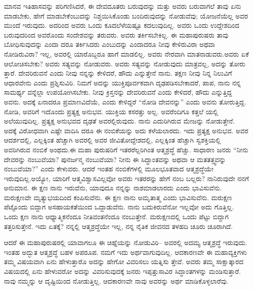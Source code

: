 ಮಾನವ ಇತಿಹಾಸವನ್ನು ಪರಿಗಣಿಸಿದರೆ, ಈ ದೇವದೂತರು ಬರುವುದನ್ನು ಮತ್ತು ಅವರು ಬರುವಾಗಲೆ ತಾವು ಏನು ಮಾಡಬೇಕು, ಹೇಗೆ ಮಾಡಬೇಕೆಂಬುದನ್ನು ನಿಶ್ಚಯಿಸಿಕೊಂಡು ಬಂದಿರುವುದನ್ನು ನೋಡುವೆವು; ಯೋಜನೆಯೆಲ್ಲ ಅವರ ಮುಂದೆ ಇರುವುದು. ಅದರಿಂದ ಅವರು ಒಂದು ಕೂದಲೆಳೆಯಷ್ಟೂ ಕದಲುವುದಿಲ್ಲ. ಅವರು ಒಂದು ಉದ್ದೇಶದಿಂದ ಬರುವುದರಿಂದ ಅವರೊಂದು ಸಂದೇಶವನ್ನು ತರುವರು. ಅವರು ತರ್ಕಿಸಬೇಕಿಲ್ಲ. ಈ ಮಹಾಪುರುಷರು ತಾವು ಬೋಧಿಸುವುದನ್ನು ಎಂದಾ ದರೂ ತರ್ಕಿಸಿದರು ಎಂಬುದನ್ನು ಎಂದಾದರೂ ನೀವು ಕೇಳಿರುವಿರಾ ಅಥವಾ ನೋಡಿರುವಿರಾ? ಇಲ್ಲ, ಅವರಲ್ಲಿ ಯಾರೊಬ್ಬರೂ ಹಾಗೆ ಮಾಡಲಿಲ್ಲ. ಅವರು ನೇರವಾಗಿ ಮಾತನಾಡುವರು.ಅವರು ಏಕೆ ಆಲೋಚಿಸಬೇಕು? ಅವರು ಸತ್ಯವನ್ನು ನೋಡುವರು. ಅವರು ಸತ್ಯವನ್ನು ನೋಡುವುದು ಮಾತ್ರವಲ್ಲ, ಅದನ್ನು ತೋರು ತ್ತಾರೆ. ದೇವರಿರುವನೆ ಎಂದು ನೀವು ನನ್ನನ್ನು ಕೇಳಿದರೆ, ಹೌದು ಎನ್ನುತ್ತೇನೆ ನಾನು. ತಕ್ಷಣ ನೀವು ನಿನ್ನ ನಿಲುವಿಗೆ ಆಧಾರವೇನು ಎಂದು ಪ್ರಶ್ನಿಸುವಿರಿ. ನಿಮಗೆ ಅದನ್ನು ಯುಕ್ತಿಪೂರ್ವಕವಾಗಿ ದೃಢಪಡಿಸಬೇಕಾದರೆ, ಪಾಪ, ನಾನು ನನ್ನ ಸಾಮರ್ಥ್ಯ ವನ್ನೆಲ್ಲಾ ಉಪಯೋಗಿಸಬೇಕು. ನೀವು ಕ್ರಿಸ್ತನನ್ನು ದೇವರಿರುವನೆ ಎಂದು ಕೇಳಿದರೆ, ಹೌದು ಎನ್ನುತ್ತಿದ್ದ ಅವನು. ಅದಕ್ಕೆ ಏನಾದರೂ ಪ್ರಮಾಣವಿದೆಯೆ, ಎಂದು ಕೇಳಿದ್ದರೆ “ನೋಡಿ ದೇವನನ್ನು” ಎಂದು ಅವನು ತೋರುತ್ತಿದ್ದ. ನೋಡಿ, ಅವರಿಗೆ ಇದೊಂದು ಪ್ರತ್ಯಕ್ಷ ಅನುಭವ. ಯುಕ್ತಿಯ ಕಸರತ್ತು ಅಲ್ಲ. ಅವರೆಂದಿಗೂ ಕತ್ತಲೆ ಯಲ್ಲಿ ಅಲೆಯುವುದಿಲ್ಲ. ಪ್ರತ್ಯಕ್ಷ ಅನುಭವದ ದೃಢತೆ ಅವರಲ್ಲಿರುವುದು. ನಾನು ಎದುರಿಗಿರುವ ಮೇಜನ್ನು ನೋಡುತ್ತೇನೆ. ಅದಕ್ಕೆ ವಿರೋಧವಾಗಿ ಎಷ್ಟೇ ವಾದಿಸಿ ದರೂ ಈ ನಂಬಿಕೆಯನ್ನು ಅದು ಕಳೆಯಲಾರದು. ಇದು ಪ್ರತ್ಯಕ್ಷ ಅನುಭವ. ಅವರ ಆದರ್ಶದಲ್ಲಿ, ಎಲ್ಲಕ್ಕಿಂತ ಹೆಚ್ಚಾಗಿ ಅವರಲ್ಲಿ ಅವರ ಜೀವಿತೋದ್ದೇಶದಲ್ಲಿ, ಎಲ್ಲಕ್ಕಿಂತ ಹೆಚ್ಚಾಗಿ ಸ್ವಶಕ್ತಿಯಲ್ಲಿ ಅವರಿಗಿರುವ ನಂಬಿಕೆ ಅಂಥದು.ಈ ಮಹಾ ಪುರುಷರಿಗೆ ಇತರರೆಲ್ಲರಿಗಿಂತ ಆತ್ಮಶ್ರದ್ಧೆ ಹೆಚ್ಚು. ಸಾಧಾರಣ ಜನರು “ನೀನು ದೇವರನ್ನು ನಂಬುವೆಯಾ? ಪುನರ್ಜನ್ಮ ನಂಬುವೆಯಾ? ನೀನು ಈ ಸಿದ್ಧಾಂತವನ್ನು ಅಥವಾ ಆ ಮತತತ್ತ್ವವನ್ನು ನಂಬುವೆಯಾ?” ಎಂದು ಕೇಳುವರು. ಆದರೆ ಇಂತಹ ನಂಬಿಕೆಗಳಲ್ಲಿ ಮೂಲಭೂತವಾದ ಆತ್ಮಶ್ರದ್ಧೆಯೇ ಇರುವುದಿಲ್ಲ.ಅಯ್ಯೋ, ಯಾರಿಗೆ ಆತ್ಮವಿಶ್ವಾಸವಿಲ್ಲವೋ ಅವರು ಇತರರನ್ನು ಹೇಗೆ ನಂಬ ಬಲ್ಲರು? ನಾನಿರುವುದೇ ನನಗೆ ಅನುಮಾನ. ಈ ಕ್ಷಣ ನಾನು ಇರುವೆನು, ಯಾವುದೂ ನನ್ನನ್ನು ನಾಶಮಾಡಲಾರದು ಎಂದು ಭಾವಿಸುವೆನು. ಮರುಕ್ಷಣವೇ ಮೃತ್ಯುಭಯದಿಂದ ಕಂಪಿಸುವೆನು. ಈ ಕ್ಷಣ ನಾನು ಅಮೃತಾತ್ಮ ಎಂದು ಭಾವಿಸುವೆನು. ಮರುಕ್ಷಣ ಪೆಟ್ಟೊಂದು ಬಿದ್ದಾಗ ಅಸಹಾಯಕತೆಯಿಂದ ಒದ್ದಾಡುವೆನು. ನಾನು ಬದುಕಿರುವೆನೋ ಇಲ್ಲವೋ ಅದು ಗೊತ್ತಿಲ್ಲ. ಒಂದು ಕ್ಷಣ ನಾನು ಆಧ್ಯಾತ್ಮಿಕನೆಂದೂ ನೀತಿವಂತನೆಂದೂ ನಂಬುತ್ತೇನೆ. ಮರುಕ್ಷಣದಲ್ಲಿ ಒಂದು ಪೆಟ್ಟು ಬಿದ್ದಾಗ ತತ್ತರಿಸುತ್ತೇನೆ. ಇದು ಏತಕ್ಕೆ? ನನ್ನಲ್ಲಿ ಆತ್ಮಶ್ರದ್ಧೆಯೇ ಇಲ್ಲ, ನನ್ನ ನೈತಿಕ ಜೀವನದ ತಳಹದಿ ಚೂರು ಚೂರಾಗಿದೆ.

ಆದರೆ ಈ ಮಹಾಪುರುಷರಲ್ಲಿ ಯಾವಾಗಲೂ ಈ ಚಿಹ್ನೆಯನ್ನು ನೋಡುವಿರಿ– ಅವರಲ್ಲಿ ಅದಮ್ಯ ಆತ್ಮಶ್ರದ್ಧೆ ಇರುವುದು. ಇಂತಹ ಅದ್ಭುತ ಆತ್ಮಶ್ರದ್ಧೆ ಬಹಳ ಅಪರೂಪ. ನಮಗೆ ಇದು ಅರ್ಥವಾಗುವುದಿಲ್ಲ. ಆದಕಾರಣವೇ ಈ ಮಹಾವ್ಯಕ್ತಿಗಳು ತಮ್ಮ ವಿಷಯವಾಗಿ ಏನು ಹೇಳುತ್ತಾರೊ ಅದನ್ನು ಹೇಗೋ ವಿವರಿಸಲು ಯತ್ನಿಸು ತ್ತೇವೆ. ಅವರು ತಮ್ಮ ಸಾಕ್ಷಾತ್ಕಾರದ ವಿಷಯದಲ್ಲಿ ಏನು ಹೇಳುವರೋ ಅದನ್ನು ವಿವರಿಸುವುದಕ್ಕೆ ಜನರು ಇಪ್ಪತ್ತುಸಾವಿರ ಸಿದ್ಧಾಂತಗಳನ್ನು ಮಂಡಿಸುತ್ತಾರೆ. ನಾವು ನಮ್ಮನ್ನು ಆ ದೃಷ್ಟಿಯಿಂದ ನೋಡುತ್ತಿಲ್ಲ. ಆದಕಾರಣವೇ ನಾವು ಅವರನ್ನು ಅರ್ಥ ಮಾಡಿಕೊಳ್ಳಲಾರೆವು.

